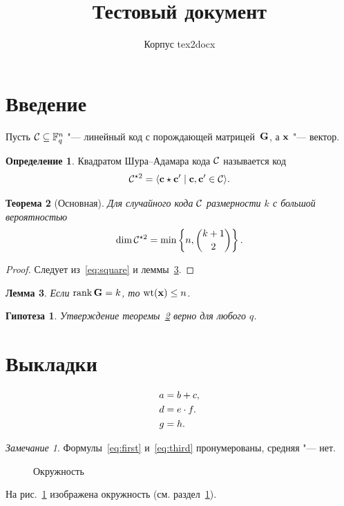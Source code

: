 \documentclass[12pt]{article}
\title{Тестовый документ}
\author{Корпус tex2docx}
\theoremstyle{plain}
\newtheorem{theorem}{Теорема}[section]
\newtheorem{lemma}[theorem]{Лемма}
\newtheorem*{conjecture}{Гипотеза}
\theoremstyle{definition}
\newtheorem{definition}[theorem]{Определение}
\theoremstyle{remark}
\newtheorem{remark}{Замечание}
\numberwithin{equation}{section}
\newcommand{\F}{\mathbb{F}}
\newcommand{\wt}[1]{\operatorname{wt}(#1)}
\DeclareMathOperator{\rank}{rank}
\begin{document}
\maketitle

\section{Введение}\label{sec:intro}

Пусть $\code{C} \subseteq \F_q^n$ "--- линейный код с порождающей
матрицей~$\mathbf{G}$, а $\mathbf{x}$ "--- вектор.

\begin{definition}\label{def:square}
Квадратом Шура--Адамара кода $\mathcal{C}$ называется код
\begin{equation}\label{eq:square}
  \mathcal{C}^{\star 2} = \langle \mathbf{c} \star \mathbf{c}' \mid
  \mathbf{c}, \mathbf{c}' \in \mathcal{C} \rangle .
\end{equation}
\end{definition}

\begin{theorem}[Основная]\label{thm:main}
Для случайного кода $\mathcal{C}$ размерности $k$ с большой вероятностью
\[
  \dim \mathcal{C}^{\star 2} = \min\left\{n, \binom{k+1}{2}\right\}.
\]
\end{theorem}

\begin{proof}
Следует из~\eqref{eq:square} и леммы~\ref{lem:aux}.
\end{proof}

\begin{lemma}\label{lem:aux}
Если $\rank \matr{G} = k$, то $\wt{\vect{x}} \le n$.
\end{lemma}

\begin{conjecture}
Утверждение теоремы~\ref{thm:main} верно для любого $q$.
\end{conjecture}

\section{Выкладки}\label{sec:calc}

\begin{align}
  a &= b + c, \label{eq:first}\\
  d &= e \cdot f. \notag\\
  g &= h. \label{eq:third}
\end{align}

\begin{remark}
Формулы~\eqref{eq:first} и~\eqref{eq:third} пронумерованы, средняя "--- нет.
\end{remark}

\begin{figure}[ht]
  \centering
  \caption{Окружность}\label{fig:circle}
\end{figure}

На рис.~\ref{fig:circle} изображена окружность (см. раздел~\ref{sec:intro}).
\end{document}
